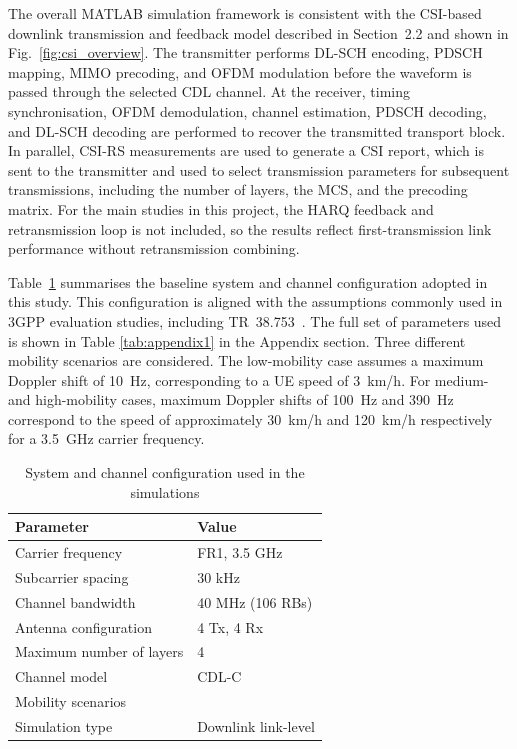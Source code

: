 \documentclass[a4paper,12pt,onecolumn]{article}
\begin{document}
	The overall MATLAB simulation framework is consistent with the CSI-based downlink transmission and feedback model described in Section~2.2 and shown in Fig.~\ref{fig:csi_overview}. The transmitter performs DL-SCH encoding, PDSCH mapping, MIMO precoding, and OFDM modulation before the waveform is passed through the selected CDL channel. At the receiver, timing synchronisation, OFDM demodulation, channel estimation, PDSCH decoding, and DL-SCH decoding are performed to recover the transmitted transport block. In parallel, CSI-RS measurements are used to generate a CSI report, which is sent to the transmitter and used to select transmission parameters for subsequent transmissions, including the number of layers, the MCS, and the precoding matrix. For the main studies in this project, the HARQ feedback and retransmission loop is not included, so the results reflect first-transmission link performance without retransmission combining.

	Table~\ref{tab:system_config} summarises the baseline system and channel configuration adopted in this study. This configuration is aligned with the assumptions commonly used in 3GPP evaluation studies, including TR~38.753~\cite{3GPPSimulationSpec}. The full set of parameters used is shown in Table \ref{tab:appendix1} in the Appendix section. Three different mobility scenarios are considered. The low-mobility case assumes a maximum Doppler shift of 10~Hz, corresponding to a UE speed of 3~km/h. For medium- and high-mobility cases, maximum Doppler shifts of 100~Hz and 390~Hz correspond to the speed of approximately 30~km/h and 120~km/h respectively for a 3.5~GHz carrier frequency.

		
		\begin{table}[H]
			\centering
			\caption{System and channel configuration used in the simulations}
			\label{tab:system_config}
			\begin{tabular}{ll}
				\hline
				\textbf{Parameter} & \textbf{Value} \\
				\toprule
				Carrier frequency      & FR1, 3.5 GHz \\
				Subcarrier spacing          & 30 kHz \\
				Channel bandwidth           & 40 MHz (106 RBs) \\
				Antenna configuration       & 4 Tx, 4 Rx \\
				Maximum number of layers    & 4 \\
				Channel model               & CDL-C \\
				Mobility scenarios          & \makecell[l]{10~Hz (Default), 100~Hz, 390~Hz}\\
				Simulation type             & Downlink link-level \\
				\hline
			\end{tabular}
		\end{table}
		
\end{document}
